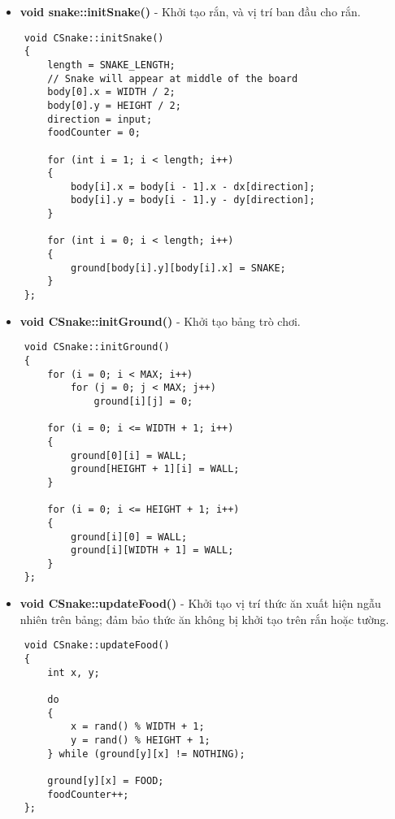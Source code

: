 \documentclass[a4paper, 12pt]{article}
\begin{document}
\begin{center}
    \begin{itemize}
        \item \textbf{void snake::initSnake()} - Khởi tạo rắn, và vị trí ban đầu cho rắn.
    \end{itemize}
    
    \begin{lstlisting}
    void CSnake::initSnake()
    {
        length = SNAKE_LENGTH;
        // Snake will appear at middle of the board
        body[0].x = WIDTH / 2;
        body[0].y = HEIGHT / 2;
        direction = input;
        foodCounter = 0;
    
        for (int i = 1; i < length; i++)
        {
            body[i].x = body[i - 1].x - dx[direction];
            body[i].y = body[i - 1].y - dy[direction];
        }
    
        for (int i = 0; i < length; i++)
        {
            ground[body[i].y][body[i].x] = SNAKE;
        }
    };
    \end{lstlisting}
\end{center}

\begin{center}
    \begin{itemize}
        \item \textbf{void CSnake::initGround()} - Khởi tạo bảng trò chơi.
    \end{itemize}
    
    \begin{lstlisting}
    void CSnake::initGround()
    {
        for (i = 0; i < MAX; i++)
            for (j = 0; j < MAX; j++)
                ground[i][j] = 0;
    
        for (i = 0; i <= WIDTH + 1; i++)
        {
            ground[0][i] = WALL;
            ground[HEIGHT + 1][i] = WALL;
        }
    
        for (i = 0; i <= HEIGHT + 1; i++)
        {
            ground[i][0] = WALL;
            ground[i][WIDTH + 1] = WALL;
        }
    };
    \end{lstlisting}
\end{center}

\begin{center}
    \begin{itemize}
        \item \textbf{void CSnake::updateFood()} - Khởi tạo vị trí thức ăn xuất hiện ngẫu nhiên trên bảng; đảm bảo thức ăn không bị khởi tạo trên rắn hoặc tường.
    \end{itemize}
    
    \begin{lstlisting}
    void CSnake::updateFood()
    {
        int x, y;
    
        do
        {
            x = rand() % WIDTH + 1;
            y = rand() % HEIGHT + 1;
        } while (ground[y][x] != NOTHING);
    
        ground[y][x] = FOOD;
        foodCounter++;
    };
    \end{lstlisting}
\end{center}
\end{document}
